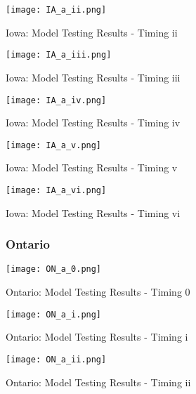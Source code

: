  
\begin{table}[H]
    \centering
    \texttt{[image: IA\_a\_ii.png]}
    \caption{Iowa: Model Testing Results - Timing ii}
    \label{fig:my_label}
\end{table}

 
\begin{table}[H]
    \centering
    \texttt{[image: IA\_a\_iii.png]}
    \caption{Iowa: Model Testing Results - Timing iii}
    \label{fig:my_label}
\end{table}

 
\begin{table}[H]
    \centering
    \texttt{[image: IA\_a\_iv.png]}
    \caption{Iowa: Model Testing Results - Timing iv}
    \label{fig:my_label}
\end{table}

 
\begin{table}[H]
    \centering
    \texttt{[image: IA\_a\_v.png]}
    \caption{Iowa: Model Testing Results - Timing v}
    \label{fig:my_label}
\end{table}

 
\begin{table}[H]
    \centering
    \texttt{[image: IA\_a\_vi.png]}
    \caption{Iowa: Model Testing Results - Timing vi}
    \label{fig:my_label}
\end{table}



\subsubsection{Ontario}

 
\begin{table}[H]
    \centering
    \texttt{[image: ON\_a\_0.png]}
    \caption{Ontario: Model Testing Results - Timing 0}
    \label{fig:my_label}
\end{table}

\begin{table}[H]
    \centering
    \texttt{[image: ON\_a\_i.png]}
    \caption{Ontario: Model Testing Results - Timing i}
    \label{fig:my_label}
\end{table}

\begin{table}[H]
    \centering
    \texttt{[image: ON\_a\_ii.png]}
    \caption{Ontario: Model Testing Results - Timing ii}
    \label{fig:my_label}
\end{table}

